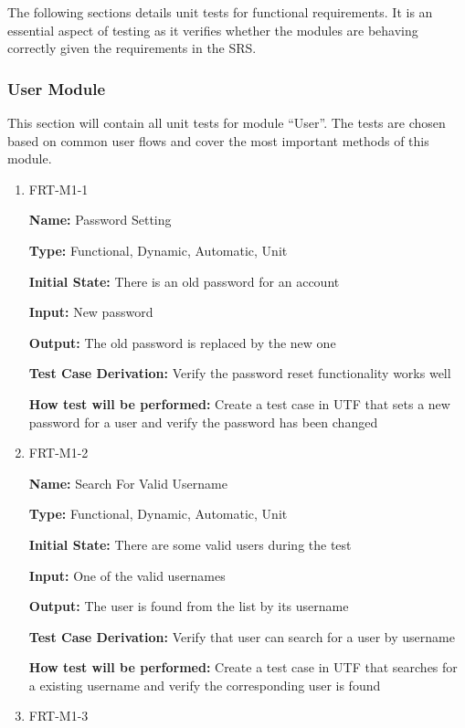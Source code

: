 \documentclass[12pt, titlepage]{article}
\begin{document}
The following sections details unit tests for functional requirements. It is an essential aspect of testing as it verifies whether the modules are behaving
correctly given the requirements in the SRS.

\subsubsection{User Module}

This section will contain all unit tests for module ``User''. The tests are chosen based on common user flows and cover the most important methods of this module.

\begin{enumerate}

\item{FRT-M1-1}

\textbf{Name:} Password Setting

\textbf{Type:} Functional, Dynamic, Automatic, Unit
					
\textbf{Initial State:} There is an old password for an account
					
\textbf{Input:} New password
					
\textbf{Output:} The old password is replaced by the new one

\textbf{Test Case Derivation:} Verify the password reset functionality works well

\textbf{How test will be performed:} Create a test case in UTF that sets a new password for a user and verify the password has been changed

\item{FRT-M1-2}

\textbf{Name:} Search For Valid Username

\textbf{Type:} Functional, Dynamic, Automatic, Unit
					
\textbf{Initial State:} There are some valid users during the test
					
\textbf{Input:} One of the valid usernames
					
\textbf{Output:} The user is found from the list by its username

\textbf{Test Case Derivation:} Verify that user can search for a user by username

\textbf{How test will be performed:} Create a test case in UTF that searches for a existing username and verify the corresponding user is found

\item{FRT-M1-3}


\end{enumerate}
\end{document}
